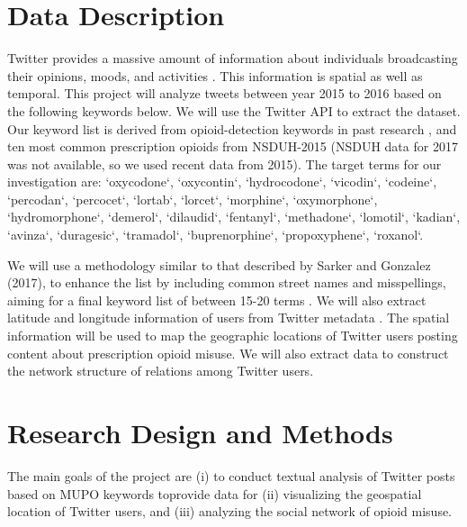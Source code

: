 \documentclass[sigconf]{acmart}
\begin{document}
\section{Data Description} 

Twitter provides a massive amount of information about individuals 
broadcasting their opinions, moods, and activities \cite{widener14}. This 
information is spatial as well as temporal. This project will analyze tweets 
between year 2015 to 2016 based on the following keywords below. We will use 
the Twitter API to extract the dataset. Our keyword list is derived from 
opioid-detection keywords in past research \cite{chary17, mackey17, lord11}, 
and ten most common prescription opioids from NSDUH-2015 \cite{shiverick17}
(NSDUH data for 2017 was not available, so we used recent data from 2015). 
The target terms for our investigation are: 
`oxycodone`, `oxycontin`, `hydrocodone`, `vicodin`, `codeine`, `percodan`, 
`percocet`, `lortab`, `lorcet`, `morphine`, `oxymorphone`, `hydromorphone`, 
`demerol`, `dilaudid`, `fentanyl`, `methadone`, `lomotil`, `kadian`, `avinza`, 
`duragesic`, `tramadol`, `buprenorphine`, `propoxyphene`, `roxanol`.

We will use a methodology similar to that described by Sarker and Gonzalez 
(2017), to enhance the list by including common street names and misspellings, 
aiming for a final keyword list of between 15-20 terms \cite{sarker17}. We 
will also extract latitude and longitude information of users from Twitter 
metadata \cite{twittergeo}. The spatial information will be used to map the 
geographic locations of Twitter users posting content about prescription
opioid misuse. We will also extract data to construct the network structure 
of relations among Twitter users. 


\section{Research Design and Methods}
The main goals of the project are (i) to conduct textual analysis of Twitter 
posts based on MUPO keywords toprovide data for (ii) visualizing the geospatial 
location of Twitter users, and (iii) analyzing the social network of opioid 
misuse.  
\end{document}
